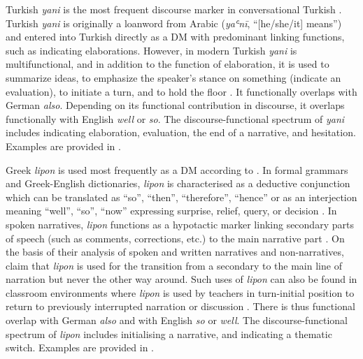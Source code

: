 \documentclass[output=paper,colorlinks,citecolor=brown]{langscibook}
\begin{document}
Turkish \textit{yani} is the most frequent discourse marker in conversational Turkish \citep*{yilmaz_descriptive_1994, yilmaz_pragmatic_2004, ozbek_discourse_1995}. Turkish \textit{yani} is originally a loanword from Arabic (\textit{yaʿnī}, “[he/she/it] means”) and entered into Turkish directly as a DM with predominant linking functions, such as indicating elaborations. However, in modern Turkish \textit{yani} is multifunctional, and in addition to the function of elaboration, it is used to summarize ideas, to emphasize the speaker’s stance on something (indicate an evaluation), to initiate a turn, and to hold the floor \citep{yilmaz_pragmatic_2004}. It functionally overlaps with German \textit{also}. Depending on its functional contribution in discourse, it overlaps functionally with English \textit{well} or \textit{so}. The discourse-functional spectrum of \textit{yani} includes indicating elaboration, evaluation, the end of a narrative, and hesitation. Examples are provided in .

Greek \textit{lipon} is used most frequently as a DM according to \citet{georgakopoulou_conjunctions_1998}. In formal grammars and Greek-English dictionaries, \textit{lipon} is characterised as a deductive conjunction \citep{triantafyllidis_modern_2019} which can be translated as “so”, “then”, “therefore”, “hence” or as an interjection meaning “well”, “so”, “now” expressing surprise, relief, query, or decision \citep[119]{stavropoulos_oxford_1988}. In spoken narratives, \textit{lipon} functions as a hypotactic marker \citep{redeker_ideational_1990} linking secondary parts of speech (such as comments, corrections, etc.) to the main narrative part \citep{antoniou_discourse_2008}. On the basis of their analysis of spoken and written narratives and non-narratives, \citet{georgakopoulou_conjunctions_1998} claim that \textit{lipon} is used for the transition from a secondary to the main line of narration but never the other way around. Such uses of \textit{lipon} can also be found in classroom environments where \textit{lipon} is used by teachers in turn-initial position to return to previously interrupted narration or discussion \citep{christodoulidou_meaning_2014}. There is thus functional overlap with German \textit{also} and with English \textit{so} or \textit{well}. The discourse-functional spectrum of \textit{lipon} includes initialising a narrative, and indicating a thematic switch. Examples are provided in .
\end{document}
